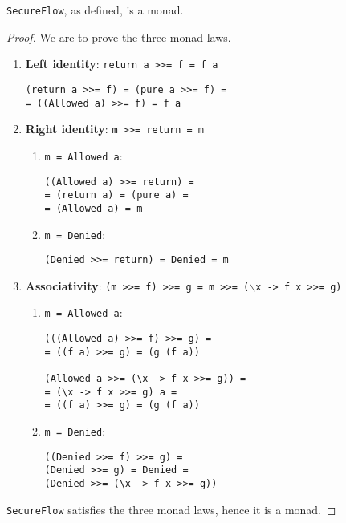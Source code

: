 \begin{proposition}
\texttt{SecureFlow}, as defined, is a monad.
\end{proposition}
\begin{proof}
We are to prove the three monad laws. 
\begin{enumerate}
	\item \textbf{Left identity}: \texttt{return a >>= f = f a}
		\begin{lstlisting}
(return a >>= f) = (pure a >>= f) = 
= ((Allowed a) >>= f) = f a
		\end{lstlisting}
	
	\item \textbf{Right identity}: \texttt{m >>= return = m}
		\begin{enumerate}
			\item \texttt{m = Allowed a}:
			\begin{lstlisting}
((Allowed a) >>= return) = 
= (return a) = (pure a) = 
= (Allowed a) = m
			\end{lstlisting}
			\item \texttt{m = Denied}:
			\begin{lstlisting}
(Denied >>= return) = Denied = m
			\end{lstlisting}
		\end{enumerate}
	
	\item \textbf{Associativity}: \texttt{(m >>= f) >>= g = m >>= ($\backslash$x -> f x >>= g)} 
		\begin{enumerate}
			\item \texttt{m = Allowed a}:
			\begin{lstlisting}
(((Allowed a) >>= f) >>= g) = 
= ((f a) >>= g) = (g (f a))

(Allowed a >>= (\x -> f x >>= g)) =
= (\x -> f x >>= g) a = 
= ((f a) >>= g) = (g (f a))
			\end{lstlisting}
			\item \texttt{m = Denied}:
			\begin{lstlisting}
((Denied >>= f) >>= g) = 
(Denied >>= g) = Denied =
(Denied >>= (\x -> f x >>= g))
			\end{lstlisting}
		\end{enumerate}
\end{enumerate}
\texttt{SecureFlow} satisfies the three monad laws, hence it is a monad.
\end{proof}